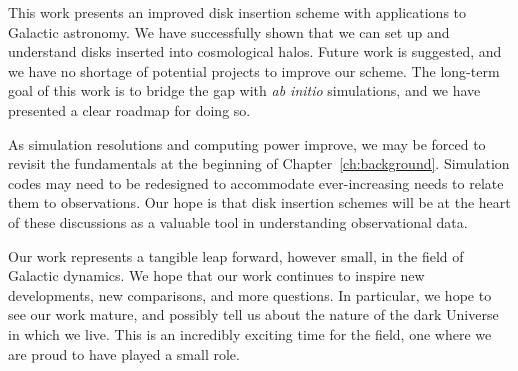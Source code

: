 
This work presents an improved disk insertion scheme with applications to Galactic astronomy. We have successfully shown that we can set up and understand disks inserted into cosmological halos. Future work is suggested, and we have no shortage of potential projects to improve our scheme. The long-term goal of this work is to bridge the gap with \textit{ab initio} simulations, and we have presented a clear roadmap for doing so.

As simulation resolutions and computing power improve, we may be forced to revisit the fundamentals at the beginning of Chapter~\ref{ch:background}. Simulation codes may need to be redesigned to accommodate ever-increasing needs to relate them to observations. Our hope is that disk insertion schemes will be at the heart of these discussions as a valuable tool in understanding observational data.

Our work represents a tangible leap forward, however small, in the field of Galactic dynamics.  We hope that our work continues to inspire new developments, new comparisons, and more questions. In particular, we hope to see our work mature, and possibly tell us about the nature of the dark Universe in which we live. This is an incredibly exciting time for the field, one where we are proud to have played a small role.




